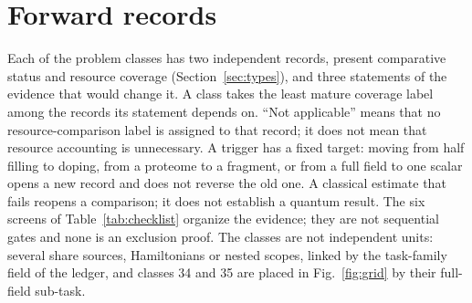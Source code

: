 \documentclass[10pt,a4paper]{article}
\begin{document}
\section{Forward records}
\label{app:forward}
Each of the \nClasses{} problem classes has two independent records, present comparative status and resource coverage (Section~\ref{sec:types}), and three statements of the evidence that would change it. A class takes the least mature coverage label among the records its statement depends on. ``Not applicable'' means that no resource-comparison label is assigned to that record; it does not mean that resource accounting is unnecessary. A trigger has a fixed target: moving from half filling to doping, from a proteome to a fragment, or from a full field to one scalar opens a new record and does not reverse the old one. A classical estimate that fails reopens a comparison; it does not establish a quantum result. The six screens of Table~\ref{tab:checklist} organize the evidence; they are not sequential gates and none is an exclusion proof. The classes are not independent units: several share sources, Hamiltonians or nested scopes, linked by the task-family field of the ledger, and classes 34 and 35 are placed in Fig.~\ref{fig:grid} by their full-field sub-task.
\end{document}
